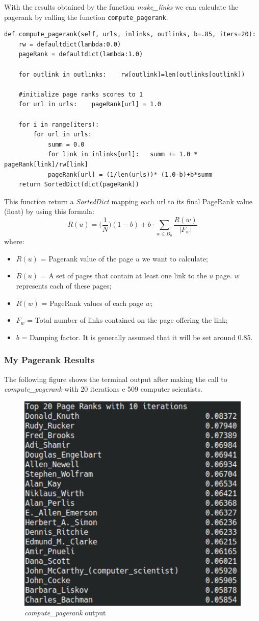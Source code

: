 \documentclass[12pt, twoside]{article}
\begin{document}
\noindent With the results obtained by the function \textit{make\_links} we can calculate the pagerank by calling the function \lstinline[language = iPython]{compute_pagerank}.
\vspace{6pt}
\begin{lstlisting}[language = iPython, caption={Computing Pagerank},captionpos=b]
def compute_pagerank(self, urls, inlinks, outlinks, b=.85, iters=20):
	rw = defaultdict(lambda:0.0)
	pageRank = defaultdict(lambda:1.0)

	for outlink in outlinks:	rw[outlink]=len(outlinks[outlink])

	#initialize page ranks scores to 1
	for url in urls:	pageRank[url] = 1.0

	for i in range(iters):
		for url in urls:
			summ = 0.0
			for link in inlinks[url]:	summ += 1.0 * pageRank[link]/rw[link]
			pageRank[url] = (1/len(urls))* (1.0-b)+b*summ
	return SortedDict(dict(pageRank))
\end{lstlisting}
This function return a \textit{SortedDict} mapping each url to its final PageRank value (float) by using this formula:
\begin{equation*}
	R(u) = \Big(\frac{1}{N}\Big) (1-b) + b \cdot \sum_{w \in B_u} \frac{R(w)}{|F_w|}
\end{equation*}
where: \begin{itemize}[noitemsep, topsep=0pt]
 	\item $R(u)$ = Pagerank value of the page $ u $ we want to calculate;
 	\item $B(u)$ = A set of pages that contain at least one link to the $ u $ page. $ w $ represents each of these pages;
 	\item $R(w)$ = PageRank values of each page	 $w$;
 	\item $F_w$ = Total number of links contained on the page offering the link;
 	\item $b$ = Damping factor. It is generally assumed that it will be set around 0.85.
 \end{itemize}
 \newpage
 
 \subsubsection{My Pagerank Results}
 The following figure shows the terminal output after making the call to \textit{compute\_pagerank} with 20 iterations e 509 computer scientists.
 \begin{figure}[htp]
 	\centering
 	\includegraphics[width = .38\textwidth]{images/top_20_my_pagerank}
 	\caption{\textit{compute\_pagerank} output}
 \end{figure}
\end{document}
